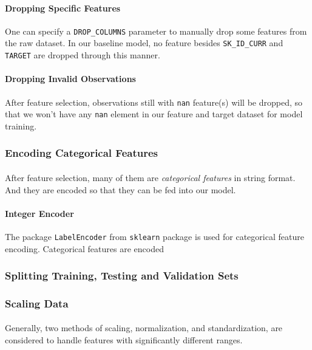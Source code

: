 \documentclass{article}
\begin{document}
				\paragraph{Dropping Specific Features} One can specify a \texttt{DROP\_COLUMNS} parameter to manually drop some features from the raw dataset. In our baseline model, no feature besides \texttt{SK\_ID\_CURR} and \texttt{TARGET} are dropped through this manner.
				
				\paragraph{Dropping Invalid Observations} After feature selection, observations still with \texttt{nan} feature(s) will be dropped, so that we won't have any \texttt{nan} element in our feature and target dataset for model training.
				
				
			\subsubsection{Encoding Categorical Features}
				\paragraph{} After feature selection, many of them are \emph{categorical features} in string format. And they are encoded so that they can be fed into our model.
				\paragraph{Integer Encoder} The package \texttt{LabelEncoder} from \texttt{sklearn} package is used  for categorical feature encoding. 
				\newline
				Categorical features are encoded
			
			\subsubsection{Splitting Training, Testing and Validation Sets}
			
			\subsubsection{Scaling Data}
				\paragraph{} Generally, two methods of scaling, normalization, and standardization, are considered to handle features with significantly different ranges.
                
\end{document}
